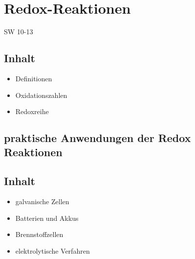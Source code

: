 \section{Redox-Reaktionen} {SW 10-13}

\subsection{Inhalt}
\begin{itemize}
\item Definitionen
\item  Oxidationszahlen
\item Redoxreihe
\end{itemize}

\subsection{praktische Anwendungen der Redox Reaktionen}

\subsection{Inhalt} %
\begin{itemize}
\item galvanische Zellen
\item  Batterien und Akkus
\item  Brennstoffzellen
\item  elektrolytische Verfahren
\end{itemize}
